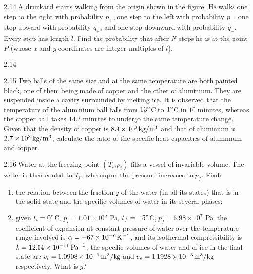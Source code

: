 \begin{problem}{2.14}
A drunkard starts walking from the origin shown in the figure. He walks one step to the right with probability $p_+$, one step to the left with probability $p_-$, one step upward with probability $q_+$, and one step downward with probability $q_-$. Every step has length $l$. Find the probability that after $N$ steps he is at the point $P$ (whose $x$ and $y$ coordinates are integer multiples of $l$).
\end{problem}

\begin{figbox}{2.14}
\end{figbox}

\begin{problem}{2.15}
Two balls of the same size and at the same temperature are both painted black, one of them being made of copper and the other of aluminium. They are suspended inside a cavity surrounded by melting ice. It is observed that the temperature of the aluminium ball falls from $13^{\circ}$C to $1^{\circ}$C in $10$ minutes, whereas the copper ball takes $14.2$ minutes to undergo the same temperature change. Given that the density of copper is $8.9\times10^{3}\,\mathrm{kg/m^3}$ and that of aluminium is $2.7\times10^{3}\,\mathrm{kg/m^3}$, calculate the ratio of the specific heat capacities of aluminium and copper.
\end{problem}

\begin{problem}{2.16}
Water at the freezing point $(T_i, p_i)$ fills a vessel of invariable volume. The water is then cooled to $T_f$, whereupon the pressure increases to $p_f$. Find:
\begin{enumerate}[label=(\arabic*),leftmargin=2.2em,itemsep=1pt,topsep=2pt]
\item the relation between the fraction $y$ of the water (in all its states) that is in the solid state and the specific volumes of water in its several phases;
\item given $t_i = 0^{\circ}$C, $p_i = 1.01\times10^{5}$ Pa, $t_f = -5^{\circ}$C, $p_f = 5.98\times10^{7}$ Pa; the coefficient of expansion at constant pressure of water over the temperature range involved is $\alpha = -67\times10^{-6}\,\mathrm{K}^{-1}$, and its isothermal compressibility is $k = 12.04\times10^{-11}\,\mathrm{Pa}^{-1}$; the specific volumes of water and of ice in the final state are $v_l = 1.0908\times10^{-3}\,\mathrm{m^3/kg}$ and $v_s = 1.1928\times10^{-3}\,\mathrm{m^3/kg}$ respectively. What is $y$?
\end{enumerate}
\end{problem}

